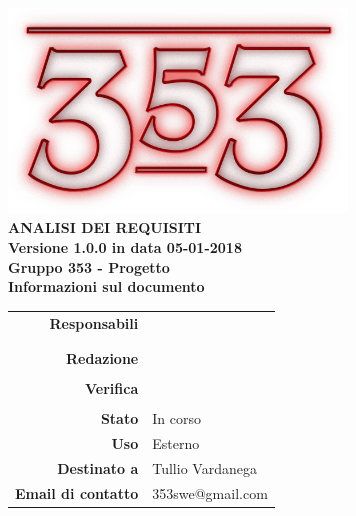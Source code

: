 \documentclass[openany, a4paper, 12pt]{report}
\begin{document}
\begin{titlepage}
	\centering
	\vfill
	{
		\bfseries
		\vskip2cm
		\includegraphics[width=9cm]{../../common/images/logo.png} \\
		\vfill
		\Huge{ANALISI DEI REQUISITI}\\
		\vfill
		\Large Versione 1.0.0 in data 05-01-2018\\
		\large Gruppo 353 - Progetto \progetto \\
		\vfill
\normalsize Informazioni sul documento\\

\begin{table}[htbp]
	\centering
	\renewcommand\arraystretch{1.2}
	\begin{tabular}{r|l}
		\hline
		\textbf{Responsabili}	& \Elena \\
								& \Parwinder\\
								& \Valentina\\
		
		\textbf{Redazione} 		& \Mirco\\
								& \Gianluca\\
		
		\textbf{Verifica} 		& \Riccardo\\
								& \Davide\\
						
		\textbf{Stato} 			& In corso\\
		\textbf{Uso}			& Esterno\\
		\textbf{Destinato a}   	& Tullio Vardanega\\
		
						
		\textbf{Email di contatto}	& 353swe@gmail.com
	\end{tabular}
\end{table}
		\vfill
	}    
\end{titlepage}

\tableofcontents
\listoffigures

\listoftables

\newpage
{}




 
\end{document}
